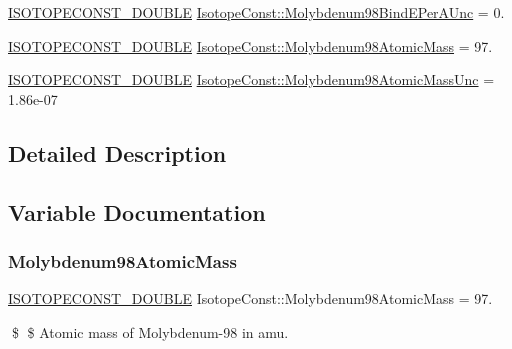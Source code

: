 \begin{DoxyCompactItemize}
\mbox{\hyperlink{group___isotope_const-_macros_ga8f45a7272ce02c0b4c65c44636ed719a}{I\+S\+O\+T\+O\+P\+E\+C\+O\+N\+S\+T\+\_\+\+D\+O\+U\+B\+LE}} \mbox{\hyperlink{group___isotope_const-_molybdenum-_mo98_ga4d95e248eaccef55e3a79fc7e67194d3}{Isotope\+Const\+::\+Molybdenum98\+Bind\+E\+Per\+A\+Unc}} = 0.
\item 
\mbox{\hyperlink{group___isotope_const-_macros_ga8f45a7272ce02c0b4c65c44636ed719a}{I\+S\+O\+T\+O\+P\+E\+C\+O\+N\+S\+T\+\_\+\+D\+O\+U\+B\+LE}} \mbox{\hyperlink{group___isotope_const-_molybdenum-_mo98_gaa49ee385bf50db5eaacf859d1018dc69}{Isotope\+Const\+::\+Molybdenum98\+Atomic\+Mass}} = 97.
\item 
\mbox{\hyperlink{group___isotope_const-_macros_ga8f45a7272ce02c0b4c65c44636ed719a}{I\+S\+O\+T\+O\+P\+E\+C\+O\+N\+S\+T\+\_\+\+D\+O\+U\+B\+LE}} \mbox{\hyperlink{group___isotope_const-_molybdenum-_mo98_ga25159694f6b037cb27b02ada1f6d256a}{Isotope\+Const\+::\+Molybdenum98\+Atomic\+Mass\+Unc}} = 1.\+86e-\/07
\end{DoxyCompactItemize}


\subsection{Detailed Description}


\subsection{Variable Documentation}
\mbox{\label{group___isotope_const-_molybdenum-_mo98_gaa49ee385bf50db5eaacf859d1018dc69}} 
\subsubsection{\texorpdfstring{Molybdenum98\+Atomic\+Mass}{Molybdenum98AtomicMass}}
{\footnotesize\ttfamily \mbox{\hyperlink{group___isotope_const-_macros_ga8f45a7272ce02c0b4c65c44636ed719a}{I\+S\+O\+T\+O\+P\+E\+C\+O\+N\+S\+T\+\_\+\+D\+O\+U\+B\+LE}} Isotope\+Const\+::\+Molybdenum98\+Atomic\+Mass = 97.}

\$ \$ Atomic mass of Molybdenum-\/98 in amu. \mbox{\label{group___isotope_const-_molybdenum-_mo98_ga25159694f6b037cb27b02ada1f6d256a}} 
